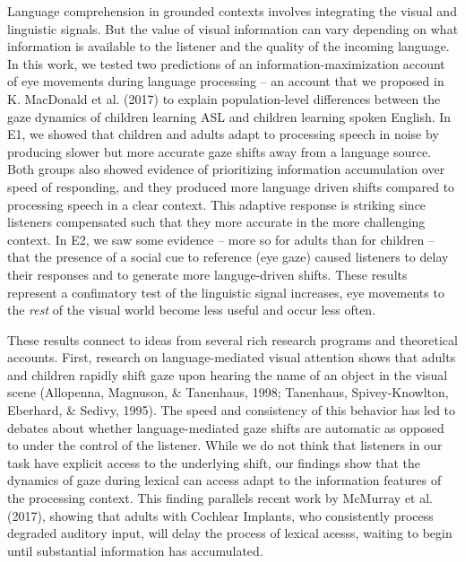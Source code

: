 \documentclass[10pt, letterpaper]{article}
\begin{document}
Language comprehension in grounded contexts involves integrating the
visual and linguistic signals. But the value of visual information can
vary depending on what information is available to the listener and the
quality of the incoming language. In this work, we tested two
predictions of an information-maximization account of eye movements
during language processing -- an account that we proposed in K.
MacDonald et al. (2017) to explain population-level differences between
the gaze dynamics of children learning ASL and children learning spoken
English. In E1, we showed that children and adults adapt to processing
speech in noise by producing slower but more accurate gaze shifts away
from a language source. Both groups also showed evidence of prioritizing
information accumulation over speed of responding, and they produced
more language driven shifts compared to processing speech in a clear
context. This adaptive response is striking since listeners compensated
such that they more accurate in the more challenging context. In E2, we
saw some evidence -- more so for adults than for children -- that the
presence of a social cue to reference (eye gaze) caused listeners to
delay their responses and to generate more languge-driven shifts. These
results represent a confimatory test of the linguistic signal increases,
eye movements to the \emph{rest} of the visual world become less useful
and occur less often.

These results connect to ideas from several rich research programs and
theoretical accounts. First, research on language-mediated visual
attention shows that adults and children rapidly shift gaze upon hearing
the name of an object in the visual scene (Allopenna, Magnuson, \&
Tanenhaus, 1998; Tanenhaus, Spivey-Knowlton, Eberhard, \& Sedivy, 1995).
The speed and consistency of this behavior has led to debates about
whether language-mediated gaze shifts are automatic as opposed to under
the control of the listener. While we do not think that listeners in our
task have explicit access to the underlying shift, our findings show
that the dynamics of gaze during lexical can access adapt to the
information features of the processing context. This finding parallels
recent work by McMurray et al. (2017), showing that adults with Cochlear
Implants, who consistently process degraded auditory input, will delay
the process of lexical acesss, waiting to begin until substantial
information has accumulated.
\end{document}
